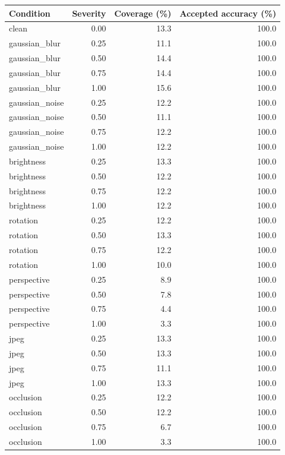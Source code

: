 \begin{tabular}{lrrr}
\toprule
Condition & Severity & Coverage (\%) & Accepted accuracy (\%) \\
\midrule
clean & 0.00 & 13.3 & 100.0 \\
gaussian\_blur & 0.25 & 11.1 & 100.0 \\
gaussian\_blur & 0.50 & 14.4 & 100.0 \\
gaussian\_blur & 0.75 & 14.4 & 100.0 \\
gaussian\_blur & 1.00 & 15.6 & 100.0 \\
gaussian\_noise & 0.25 & 12.2 & 100.0 \\
gaussian\_noise & 0.50 & 11.1 & 100.0 \\
gaussian\_noise & 0.75 & 12.2 & 100.0 \\
gaussian\_noise & 1.00 & 12.2 & 100.0 \\
brightness & 0.25 & 13.3 & 100.0 \\
brightness & 0.50 & 12.2 & 100.0 \\
brightness & 0.75 & 12.2 & 100.0 \\
brightness & 1.00 & 12.2 & 100.0 \\
rotation & 0.25 & 12.2 & 100.0 \\
rotation & 0.50 & 13.3 & 100.0 \\
rotation & 0.75 & 12.2 & 100.0 \\
rotation & 1.00 & 10.0 & 100.0 \\
perspective & 0.25 & 8.9 & 100.0 \\
perspective & 0.50 & 7.8 & 100.0 \\
perspective & 0.75 & 4.4 & 100.0 \\
perspective & 1.00 & 3.3 & 100.0 \\
jpeg & 0.25 & 13.3 & 100.0 \\
jpeg & 0.50 & 13.3 & 100.0 \\
jpeg & 0.75 & 11.1 & 100.0 \\
jpeg & 1.00 & 13.3 & 100.0 \\
occlusion & 0.25 & 12.2 & 100.0 \\
occlusion & 0.50 & 12.2 & 100.0 \\
occlusion & 0.75 & 6.7 & 100.0 \\
occlusion & 1.00 & 3.3 & 100.0 \\
\bottomrule
\end{tabular}
